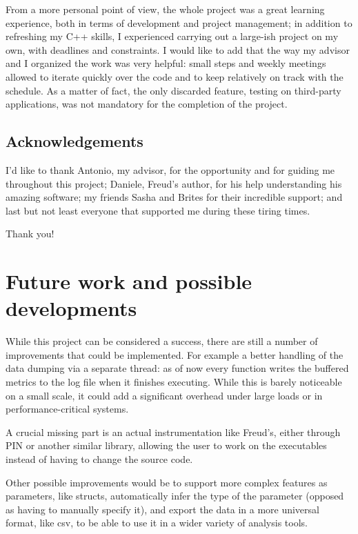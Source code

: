\documentclass[11pt,english,singlespacing,headsepline,consistentlayout]{auxiliary/si-msc-thesis}
\begin{document}
From a more personal point of view, the whole project was a great
learning experience, both in terms of development and project
management; in addition to refreshing my C++ skills, I experienced
carrying out a large-ish project on my own, with deadlines and
constraints.  I would like to add that the way my advisor and I
organized the work was very helpful: small steps and weekly meetings
allowed to iterate quickly over the code and to keep relatively on
track with the schedule. As a matter of fact, the only discarded
feature, testing on third-party applications, was not mandatory for
the completion of the project.

\subsection*{Acknowledgements}

I'd like to thank Antonio, my advisor, for the opportunity and for
guiding me throughout this project; Daniele, Freud's author, for his
help understanding his amazing software; my friends Sasha and Brites
for their incredible support; and last but not least everyone that
supported me during these tiring times.

Thank you!


\section{Future work and possible developments}

While this project can be considered a success, there are
still a number of improvements that could be implemented. For example
a better handling of the data dumping via a separate thread: as of now
every function writes the buffered metrics to the log file when it
finishes executing. While this is barely noticeable on a small scale,
it could add a significant overhead under large loads or in
performance-critical systems.

A crucial missing part is an actual instrumentation like
Freud's, either through PIN or another similar library, allowing the
user to work on the executables instead of having to change the source
code.

Other possible improvements would be to support more complex
features as parameters, like structs, automatically infer the type of
the parameter (opposed as having to manually specify it), and export
the data in a more universal format, like csv, to be able to use it in
a wider variety of analysis tools.



%


\newpage  
\end{document}
